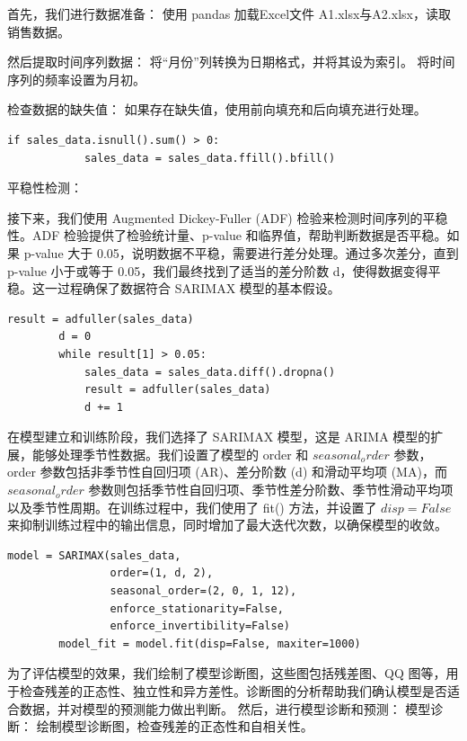 \documentclass[a4paper]{article}
\begin{document}
	首先，我们进行数据准备：
	使用 pandas 加载Excel文件 A1.xlsx与A2.xlsx，读取销售数据。

	然后提取时间序列数据：
	将“月份”列转换为日期格式，并将其设为索引。
	将时间序列的频率设置为月初。

	检查数据的缺失值：
	如果存在缺失值，使用前向填充和后向填充进行处理。
	\begin{lstlisting}[caption={Python Example}, label={lst:example}]
		if sales_data.isnull().sum() > 0:
    		sales_data = sales_data.ffill().bfill()
	\end{lstlisting}

	平稳性检测：

	接下来，我们使用 Augmented Dickey-Fuller (ADF) 检验来检测时间序列的平稳性。ADF 检验提供了检验统计量、p-value 和临界值，帮助判断数据是否平稳。如果 p-value 大于 0.05，说明数据不平稳，需要进行差分处理。通过多次差分，直到 p-value 小于或等于 0.05，我们最终找到了适当的差分阶数 d，使得数据变得平稳。这一过程确保了数据符合 SARIMAX 模型的基本假设。
	\begin{lstlisting}[caption={Python Example}, label={lst:example}]
		result = adfuller(sales_data)
		d = 0
		while result[1] > 0.05:
			sales_data = sales_data.diff().dropna()
			result = adfuller(sales_data)
			d += 1
	\end{lstlisting}

	在模型建立和训练阶段，我们选择了 SARIMAX 模型，这是 ARIMA 模型的扩展，能够处理季节性数据。我们设置了模型的 order 和 $seasonal_order$ 参数，order 参数包括非季节性自回归项 (AR)、差分阶数 (d) 和滑动平均项 (MA)，而 $seasonal_order$ 参数则包括季节性自回归项、季节性差分阶数、季节性滑动平均项以及季节性周期。在训练过程中，我们使用了 fit() 方法，并设置了 $disp=False$ 来抑制训练过程中的输出信息，同时增加了最大迭代次数，以确保模型的收敛。
	\begin{lstlisting}[caption={Python Example}, label={lst:example}]
		model = SARIMAX(sales_data,
                order=(1, d, 2),
                seasonal_order=(2, 0, 1, 12),
                enforce_stationarity=False,
                enforce_invertibility=False)
		model_fit = model.fit(disp=False, maxiter=1000)
	\end{lstlisting}
	为了评估模型的效果，我们绘制了模型诊断图，这些图包括残差图、QQ 图等，用于检查残差的正态性、独立性和异方差性。诊断图的分析帮助我们确认模型是否适合数据，并对模型的预测能力做出判断。
	然后，进行模型诊断和预测：
	模型诊断：
	绘制模型诊断图，检查残差的正态性和自相关性。
\end{document}
